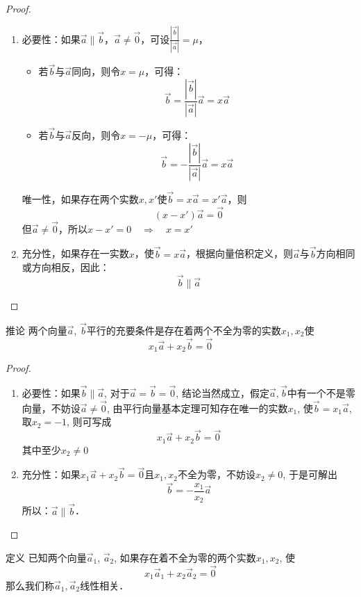 \begin{proof}
\begin{enumerate}
    \item 必要性：如果$\vec{a}\parallel \vec{b}$，$\vec{a}\ne \vec{0}$，可设$\frac{|\vec{b}|}{|\vec{a}|}=\mu$，
\begin{itemize}
    \item 若$\vec{b}$与$\vec{a}$同向，则令$x=\mu$，可得：
\[\vec{b}=\frac{|\vec{b}|}{|\vec{a}|}\vec{a}=x\vec{a}\]
    \item  若$\vec{b}$与$\vec{a}$反向，则令$x=-\mu$，可得：
\[\vec{b}=-\frac{|\vec{b}|}{|\vec{a}|}\vec{a}=x\vec{a}\]
\end{itemize}

唯一性，如果存在两个实数$x,x'$使$\vec{b}=x\vec{a}=x'\vec{a}$，则
\[(x-x')\vec{a}=\vec{0}\]
但$\vec{a}\ne \vec{0}$，所以$x-x'=0\quad \Rightarrow\quad x=x'$

\item 充分性，如果存在一实数$x$，使$\vec{b}=x\vec{a}$，根据向量倍积定义，则$\vec{a}$与$\vec{b}$方向相同或方向相反，因此：
\[\vec{b}\parallel \vec{a}\]
\end{enumerate}
\end{proof}

\begin{blk}
{推论} 两个向量$\vec{a}$, $\vec{b}$平行的充要条件是存在着两个不全为零的实数$x_1,x_2$使
\[x_1\vec{a}+x_2\vec{b}=\vec{0}\]
\end{blk}

\begin{proof}
\begin{enumerate}
    \item 必要性：如果$\vec{b}\parallel \vec{a}$, 对于$\vec{a}=\vec{b}=\vec{0}$, 结论当然成立，假定$\vec{a}, \vec{b}$中有一个不是零向量，不妨设$\vec{a}\ne \vec{0}$, 由平行向量基本定理可知存在唯一的实数$x_1$, 使$\vec{b}=x_1\vec{a}$, 取$x_2=-1$, 则可写成
    \[x_1\vec{a}+x_2\vec{b}=\vec{0}\]
其中至少$x_2\ne 0$
\item 充分性：如果$x_1\vec{a}+x_2\vec{b}=\vec{0}$且$x_1,x_2$不全为零，不妨设$x_2\ne 0$, 于是可解出
\[\vec{b}=-\frac{x_1}{x_2}\vec{a}\]
所以：$\vec{a}\parallel \vec{b}$．
\end{enumerate}
\end{proof}

\begin{blk}
    {定义} 已知两个向量$\vec{a}_1$, $\vec{a}_2$, 如果存在着不全为零的两个实数$x_1,x_2$, 使
    \[x_1\vec{a}_1+x_2\vec{a}_2=\vec{0}\]
那么我们称$\vec{a}_1,\vec{a}_2$线性相关．
\end{blk}

